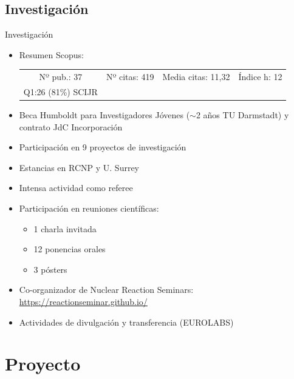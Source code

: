 \documentclass{beamer}
\begin{document}
\subsection{Investigación}
\begin{frame}{Investigación}
    \begin{itemize}
        \item Resumen Scopus:
        \begin{center}
        \begin{tabular}{cccc}
        Nº pub.: 37 & Nº citas: 419 & Media citas: 11,32 & Índice h: 12\\
        \tiny Q1:26 (81\%) SCIJR &&&
        \end{tabular}
        \end{center}
        \item Beca Humboldt para Investigadores Jóvenes ($\sim$2 años TU Darmstadt) y contrato JdC Incorporación
    \item Participación en 9 proyectos de investigación
        \item Estancias en RCNP y U. Surrey  

    \item Intensa actividad como referee    
    \item Participación en reuniones científicas:  
    \begin{itemize}
    \item 1 charla invitada
    \item 12 ponencias orales
    \item 3 pósters
    \end{itemize}
    \item Co-organizador de Nuclear Reaction Seminars: \url{https://reactionseminar.github.io/}
    \item Actividades de divulgación y transferencia (EUROLABS)
    \end{itemize}
\end{frame}

\section{Proyecto}
\end{document}
